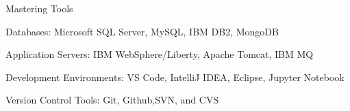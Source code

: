 \begin{cventries}
\vspace{-1em}

    \cventry
    {Mastering Tools}
    {}
    {}
    {}
    {
      \begin{cvitems}
        \item {Databases: Microsoft SQL Server, MySQL, IBM DB2, MongoDB}
        \item {Application Servers: IBM WebSphere/Liberty, Apache Tomcat, IBM MQ}
        \item {Development Environments: VS Code, IntelliJ IDEA, Eclipse, Jupyter Notebook}
        \item {Version Control Tools: Git, Github,SVN, and CVS }
      \end{cvitems}
    }
    
    
\end{cventries}

\vspace{-1em}